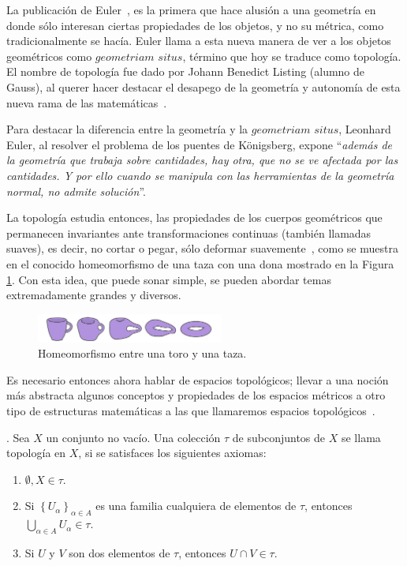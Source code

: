 La publicación de Euler~\cite{euler1736}, es la primera que hace alusión a una
geometría en donde sólo interesan ciertas propiedades de los objetos, y no su
métrica, como tradicionalmente se hacía. Euler llama a esta nueva manera de ver
a los objetos geométricos como $geometriam$ $situs$, término que hoy se traduce
como topología. El nombre de topología fue dado por Johann Benedict Listing
(alumno de Gauss), al querer hacer destacar el desapego de la geometría y
autonomía de esta nueva rama de las matemáticas~\cite{listing}.
 
Para destacar la diferencia entre la geometría y la $geometriam$ $situs$,
Leonhard Euler, al resolver el problema de los puentes de K\"onigsberg, expone
``{\em además de la geometría que trabaja sobre cantidades, hay otra, que no se
ve afectada por las cantidades. Y por ello cuando se manipula con las
herramientas de la geometría normal, no admite solución}''.

La topología estudia entonces, las propiedades de los cuerpos geométricos que
permanecen invariantes ante transformaciones continuas (también llamadas
suaves), es decir, no cortar o pegar, sólo deformar suavemente~\cite{moderna},
como se muestra en el conocido homeomorfismo de una taza con una dona mostrado
en la Figura \ref{dona_taza}.  Con esta idea, que puede sonar simple, se pueden
abordar temas extremadamente grandes y diversos.
%
\begin{figure}[h]
    \centering
    \includegraphics[width=0.55\textwidth]{2/img/dona_taza}
    \caption{Homeomorfismo entre una toro y una taza.}
\label{dona_taza}
\end{figure}

Es necesario entonces ahora hablar de espacios topológicos; llevar a una noción
más abstracta algunos conceptos y propiedades de los espacios métricos a otro
tipo de estructuras matemáticas a las que llamaremos espacios
topológicos~\cite{sergey}.

{}. Sea $X$ un conjunto no vacío. Una colección $\tau$ de
subconjuntos de $X$ se llama topología en $X$, si se satisfaces los siguientes
axiomas:
\begin{enumerate}
  \item $\emptyset , X \in \tau$.
  \item Si $\left \{U_{\alpha} \right \}_{\alpha \in A}$ es una familia cualquiera de elementos de $\tau$,
  entonces $\displaystyle\bigcup_{\alpha\in A}{U_\alpha \in\tau}$.
  \item Si $U$ y $V$ son dos elementos de $\tau$, entonces $U \cap V \in \tau$.
\end{enumerate}

